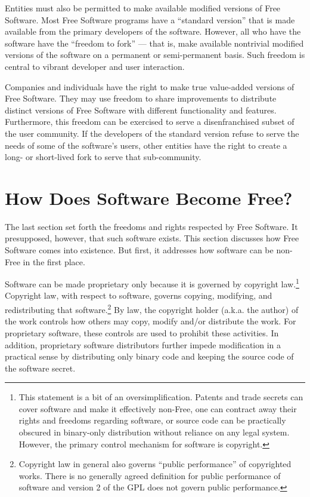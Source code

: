 \documentclass[11pt, letterpaper]{book}
\begin{document}
Entities must also be permitted to make available modified versions of
Free Software. Most Free Software programs have a ``standard version''
that is made available from the primary developers of the software.
However, all who have the software have the ``freedom to fork'' --- that
is, make available nontrivial modified versions of the software on a
permanent or semi-permanent basis. Such freedom is central to vibrant
developer and user interaction.

Companies and individuals have the right to make true value-added versions
of Free Software. They may use freedom to share improvements to
distribute distinct versions of Free Software with different functionality
and features. Furthermore, this freedom can be exercised to serve a
disenfranchised subset of the user community. If the developers of the
standard version refuse to serve the needs of some of the software's
users, other entities have the right to create a long- or short-lived fork
to serve that sub-community.

\section{How Does Software Become Free?}

The last section set forth the freedoms and rights respected by Free
Software. It presupposed, however, that such software exists. This
section discusses how Free Software comes into existence. But first, it
addresses how software can be non-Free in the first place.

Software can be made proprietary only because it is governed by copyright
law.\footnote{This statement is a bit of an oversimplification. Patents
  and trade secrets can cover software and make it effectively non-Free,
  one can contract away their rights and freedoms regarding software, or
  source code can be practically obscured in binary-only distribution
  without reliance on any legal system. However, the primary control
  mechanism for software is copyright.} Copyright law, with respect to
software, governs copying, modifying, and redistributing that
software.\footnote{Copyright law in general also governs ``public
  performance'' of copyrighted works. There is no generally agreed
  definition for public performance of software and version 2 of the GPL
  does not govern public performance.} By law, the copyright holder (a.k.a.
the author) of the work controls how others may copy, modify and/or
distribute the work. For proprietary software, these controls are used to
prohibit these activities. In addition, proprietary software distributors
further impede modification in a practical sense by distributing only
binary code and keeping the source code of the software secret.
\end{document}
